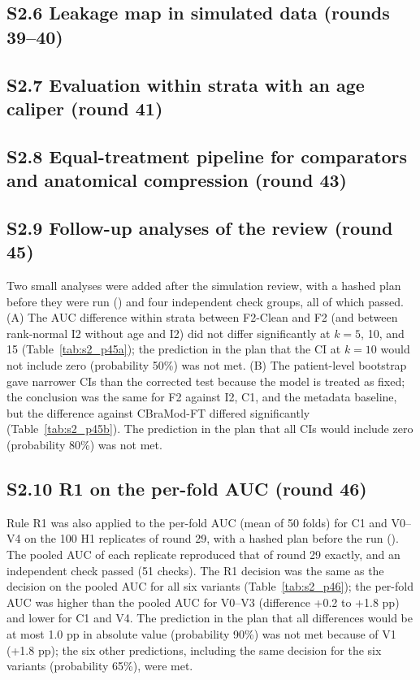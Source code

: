 \subsection*{S2.6 Leakage map in simulated data (rounds 39--40)}


\subsection*{S2.7 Evaluation within strata with an age caliper (round 41)}


\subsection*{S2.8 Equal-treatment pipeline for comparators and anatomical compression (round 43)}


\subsection*{S2.9 Follow-up analyses of the review (round 45)}
Two small analyses were added after the simulation review, with a hashed plan before they were run () and four independent check groups, all of which passed. (A) The AUC difference within strata between F2-Clean and F2 (and between rank-normal I2 without age and I2) did not differ significantly at $k=5$, 10, and 15 (Table~\ref{tab:s2_p45a}); the prediction in the plan that the CI at $k=10$ would not include zero (probability 50\%) was not met. (B) The patient-level bootstrap gave narrower CIs than the corrected test because the model is treated as fixed; the conclusion was the same for F2 against I2, C1, and the metadata baseline, but the difference against CBraMod-FT differed significantly (Table~\ref{tab:s2_p45b}). The prediction in the plan that all CIs would include zero (probability 80\%) was not met.



\subsection*{S2.10 R1 on the per-fold AUC (round 46)}
Rule R1 was also applied to the per-fold AUC (mean of 50 folds) for C1 and V0--V4 on the 100 H1 replicates of round 29, with a hashed plan before the run (). The pooled AUC of each replicate reproduced that of round 29 exactly, and an independent check passed (51 checks). The R1 decision was the same as the decision on the pooled AUC for all six variants (Table~\ref{tab:s2_p46}); the per-fold AUC was higher than the pooled AUC for V0--V3 (difference +0.2 to +1.8 pp) and lower for C1 and V4. The prediction in the plan that all differences would be at most 1.0 pp in absolute value (probability 90\%) was not met because of V1 (+1.8 pp); the six other predictions, including the same decision for the six variants (probability 65\%), were met.


